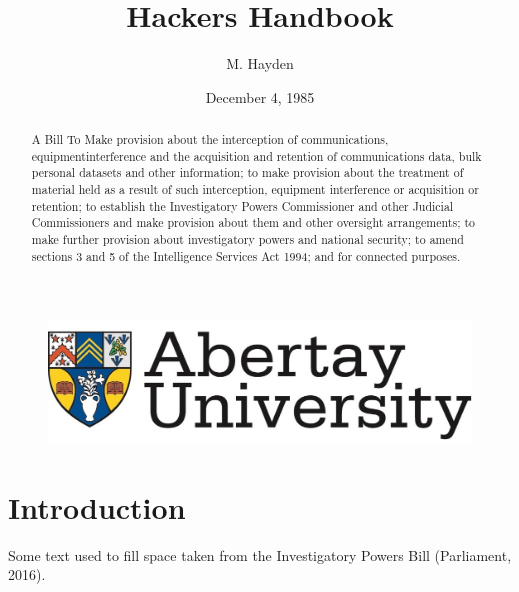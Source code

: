 \documentclass[12pt,a4paper]{article}
\title{Hackers Handbook}
\author{M. Hayden}
\affil{BSc Ethical Hacking\\
		Abertay University\\
		Dundee, United Kingdom\\
		StudentNumber@abertay.ac.uk}
\date{December 4, 1985}
\begin{document}

	\begin{figure}
		\includegraphics[width=\linewidth]{img/unilogo}
	\end{figure}

	\maketitle

	\newpage				
		\begin{abstract}
		 A Bill To Make provision about the interception of communications, equipmentinterference and the acquisition and retention of communications data, bulk personal datasets and other information; to make provision about the treatment of material held as a result of such interception, equipment interference or acquisition or retention; to establish the Investigatory Powers Commissioner and other Judicial Commissioners and make provision about them and other oversight arrangements; to make further provision about investigatory powers and national security; to amend sections 3 and 5 of the Intelligence Services Act 1994; and for connected purposes.			
			
		\end{abstract}

	\newpage
	\tableofcontents
	\newpage
				
		

	\section{Introduction}
		 Some text used to fill space taken from the Investigatory Powers Bill (Parliament, 2016).
		
\end{document}
